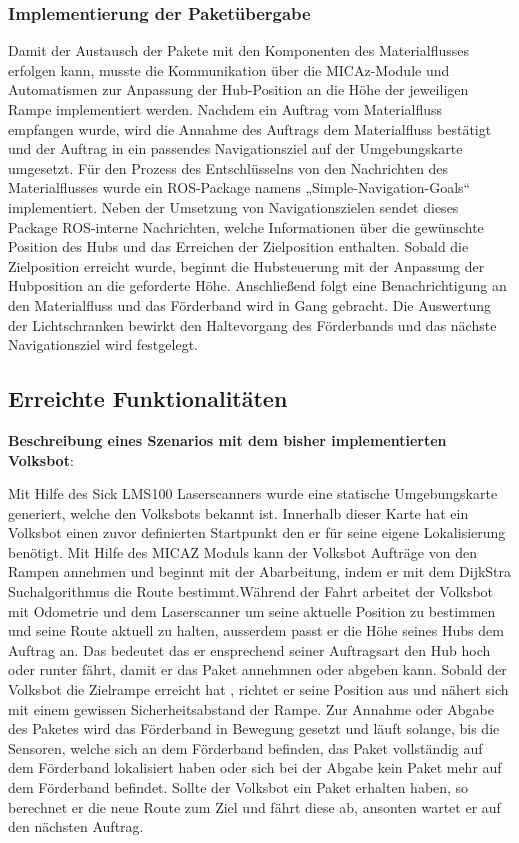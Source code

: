 \subsubsection{Implementierung der Paketübergabe}
Damit der Austausch der Pakete mit den Komponenten des Materialflusses erfolgen kann, musste die Kommunikation über die MICAz-Module und Automatismen zur Anpassung der Hub-Position an die Höhe der jeweiligen Rampe implementiert werden. Nachdem ein Auftrag vom Materialfluss empfangen wurde, wird die Annahme des Auftrags dem Materialfluss bestätigt und der Auftrag  in ein passendes Navigationsziel auf der Umgebungskarte umgesetzt.  Für den Prozess des Entschlüsselns von den Nachrichten des Materialflusses wurde ein ROS-Package namens „Simple-Navigation-Goals“ implementiert. Neben der Umsetzung von Navigationszielen sendet dieses Package ROS-interne Nachrichten, welche Informationen über die gewünschte Position des Hubs und das Erreichen der Zielposition enthalten.
Sobald die Zielposition erreicht wurde, beginnt die Hubsteuerung mit der Anpassung der Hubposition an die geforderte Höhe. Anschließend folgt eine Benachrichtigung an den Materialfluss und das Förderband wird in Gang gebracht. Die Auswertung der Lichtschranken bewirkt den Haltevorgang des Förderbands und das nächste Navigationsziel wird festgelegt.


\subsection{Erreichte Funktionalitäten}

\textbf{Beschreibung eines Szenarios mit dem bisher implementierten Volksbot}:

Mit Hilfe des Sick LMS100 Laserscanners wurde eine statische Umgebungskarte generiert, welche den Volksbots bekannt ist. Innerhalb dieser Karte hat ein Volksbot einen zuvor definierten Startpunkt den er für seine eigene Lokalisierung benötigt. Mit Hilfe des MICAZ Moduls kann der Volksbot Aufträge von den Rampen annehmen und beginnt mit der Abarbeitung, indem er mit dem DijkStra Suchalgorithmus die Route bestimmt.Während der Fahrt arbeitet der Volksbot mit Odometrie und dem Laserscanner um seine aktuelle Position zu bestimmen und seine Route aktuell zu halten, ausserdem passt er die Höhe seines Hubs dem Auftrag an. Das bedeutet das er ensprechend seiner Auftragsart den Hub hoch oder runter fährt, damit er das Paket annehmnen oder abgeben kann. Sobald der Volksbot die Zielrampe erreicht hat , richtet er seine Position aus und nähert sich mit einem gewissen Sicherheitsabstand der Rampe. Zur Annahme oder Abgabe des Paketes wird das Förderband in Bewegung gesetzt und läuft solange, bis die Sensoren, welche sich an dem Förderband befinden, das Paket vollständig auf dem Förderband lokalisiert haben oder sich bei der Abgabe kein Paket mehr auf dem Förderband befindet. Sollte der Volksbot ein Paket erhalten haben, so berechnet er die neue Route zum Ziel und fährt diese ab, ansonten wartet er auf den nächsten Auftrag.


